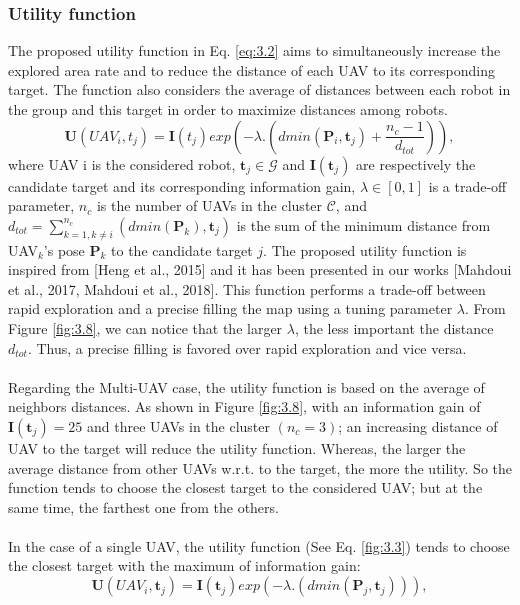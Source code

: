 \documentclass[11pt,openany]{book}
\begin{document}
\subsubsection{Utility function}
The proposed utility function in Eq. \ref{eq:3.2} aims to simultaneously increase the explored area rate and to reduce the distance of each UAV to its corresponding target. The function also considers the average of distances between each robot in the group and this target in order to maximize distances among robots.
\begin{equation}
    \mathbf{U}(UAV_i,t_j)=\mathbf{I}(t_j)exp(-\lambda.(dmin(\mathbf{P}_i,\mathbf{t}_j)+\frac{n_c-1}{d_{tot}})),
\end{equation}
where UAV i is the considered robot, $\mathbf{t}_j \in \mathcal{G}$ and $\mathbf{I}(\mathbf{t}_j)$ are respectively the candidate target and its corresponding information gain, $\lambda \in [0,1]$ is a trade-oﬀ parameter, $n_c$ is the number of UAVs in the cluster $\mathcal{C}$, and $d_{tot} = \sum_{k=1, k\neq i}^{n_c}(dmin(\mathbf{P}_k),\mathbf{t}_j) $ is the sum of the minimum distance from UAV$_k$'s pose $\mathbf{P}_k$ to the candidate target $j$. The proposed utility function is inspired from [Heng et al., 2015] and it has been presented in our works [Mahdoui et al., 2017, Mahdoui et al., 2018]. This function performs a trade-oﬀ between rapid exploration and a precise ﬁlling the map using a tuning parameter $\lambda$. From Figure \ref{fig:3.8}, we can notice that the larger $\lambda$, the less important the distance $d_{tot}$. Thus, a precise ﬁlling is favored over rapid exploration and vice versa.\\\\
Regarding the Multi-UAV case, the utility function is based on the average of neighbors distances. As shown in Figure \ref{fig:3.8}, with an information gain of $\mathbf{I}(\mathbf{t}_j)=25$ and three UAVs in the cluster $(n_c=3)$; an increasing distance of UAV to the target will reduce the utility function. Whereas, the larger the average distance from other UAVs w.r.t. to the target, the more the utility. So the function tends to choose the closest target to the considered UAV; but at the same time, the farthest one from the others.\\\\
In the case of a single UAV, the utility function (See Eq. \ref{fig:3.3}) tends to choose the closest target with the maximum of information gain:
\begin{equation}
    \mathbf{U}(UAV_i,\mathbf{t}_j)=\mathbf{I}(\mathbf{t}_j)exp(-\lambda.(dmin(\mathbf{P}_j,\mathbf{t}_j))),
\end{equation}
\end{document}
